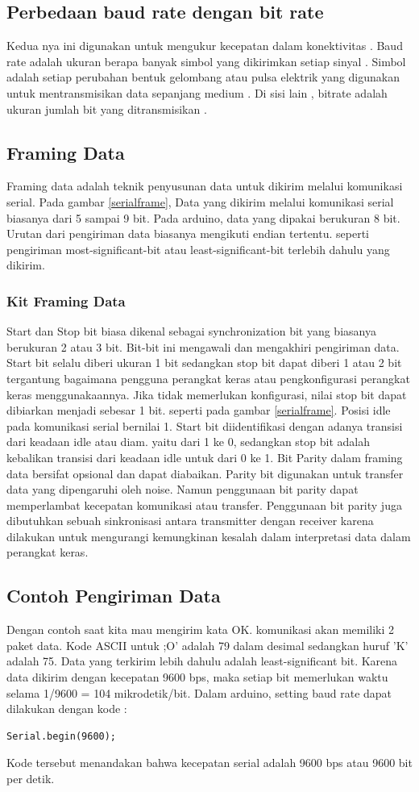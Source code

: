 \subsection{ Perbedaan baud rate dengan bit rate }
Kedua nya ini digunakan untuk mengukur kecepatan dalam konektivitas . Baud rate adalah ukuran berapa banyak simbol yang dikirimkan setiap sinyal . Simbol adalah setiap perubahan bentuk gelombang atau pulsa elektrik yang digunakan untuk mentransmisikan data sepanjang medium . Di sisi lain , bitrate adalah ukuran jumlah bit yang ditransmisikan .

\subsection{Framing Data}
Framing data adalah teknik penyusunan data untuk dikirim melalui komunikasi serial. Pada gambar \ref{serialframe}, Data yang dikirim melalui komunikasi serial biasanya dari 5 sampai 9 bit. Pada arduino, data yang dipakai berukuran 8 bit. Urutan dari pengiriman data biasanya mengikuti endian tertentu. seperti pengiriman most-significant-bit atau least-significant-bit terlebih dahulu yang dikirim.
\subsubsection{Kit Framing Data}
Start dan Stop bit biasa dikenal sebagai synchronization bit yang biasanya berukuran 2 atau 3 bit. Bit-bit ini mengawali dan mengakhiri pengiriman data. Start bit selalu diberi ukuran 1 bit sedangkan stop bit dapat diberi 1 atau 2 bit tergantung bagaimana pengguna perangkat keras atau pengkonfigurasi perangkat keras menggunakaannya. Jika tidak memerlukan konfigurasi, nilai stop bit dapat dibiarkan menjadi sebesar 1 bit. seperti pada gambar \ref{serialframe}.
Posisi idle pada komunikasi serial bernilai 1. Start bit diidentifikasi dengan adanya transisi dari keadaan idle atau diam. yaitu dari 1 ke 0, sedangkan stop bit adalah kebalikan transisi dari keadaan idle untuk dari 0 ke 1.
Bit Parity dalam framing data bersifat opsional dan dapat diabaikan. Parity bit digunakan untuk transfer data yang dipengaruhi oleh noise. Namun penggunaan bit parity dapat memperlambat kecepatan komunikasi atau transfer. Penggunaan bit parity juga dibutuhkan sebuah sinkronisasi antara transmitter dengan receiver karena dilakukan untuk mengurangi kemungkinan kesalah dalam interpretasi data dalam perangkat keras.

\subsection{Contoh Pengiriman Data}
Dengan contoh saat kita mau mengirim kata OK. komunikasi akan memiliki 2 paket data. Kode ASCII untuk ;O' adalah 79 dalam desimal sedangkan huruf 'K' adalah 75. Data yang terkirim lebih dahulu adalah least-significant bit. Karena data dikirim dengan kecepatan 9600 bps, maka setiap bit memerlukan waktu selama 1/9600 = 104 mikrodetik/bit. Dalam arduino, setting baud rate dapat dilakukan dengan kode :
\begin{verbatim}
Serial.begin(9600);
\end{verbatim}
Kode tersebut menandakan bahwa kecepatan serial adalah 9600 bps atau 9600 bit per detik.


